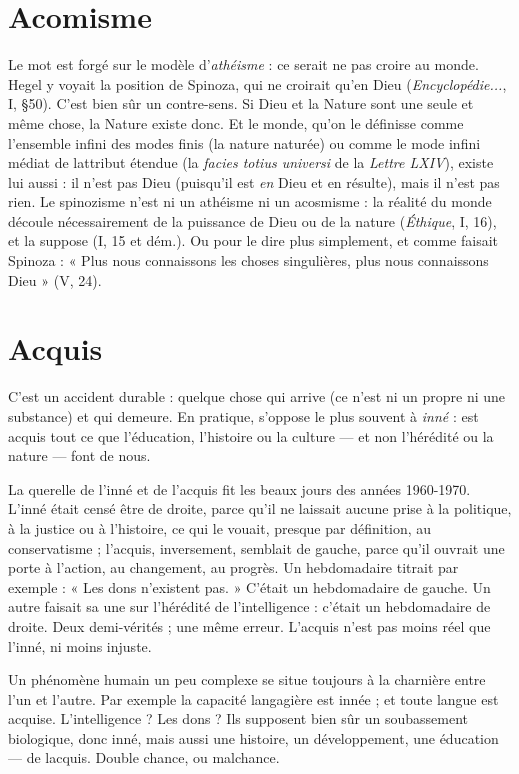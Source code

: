 \section{Acomisme}
Le mot est forgé sur le modèle d’{\it athéisme} : ce serait ne pas
croire au monde. Hegel y voyait la position de Spinoza, qui
ne croirait qu’en Dieu ({\it Encyclopédie...}, I, \S 50). C’est bien sûr un contre-sens.
Si Dieu et la Nature sont une seule et même chose, la Nature existe
donc. Et le monde, qu’on le définisse comme l’ensemble infini des modes
finis (la nature naturée) ou comme le mode infini médiat de lattribut
étendue (la {\it facies totius universi} de la {\it Lettre LXIV}), existe lui aussi : il n’est
pas Dieu (puisqu'il est {\it en} Dieu et en résulte), mais il n’est pas rien. Le spinozisme
n’est ni un athéisme ni un acosmisme : la réalité du monde découle
nécessairement de la puissance de Dieu ou de la nature ({\it Éthique}, I, 16), et
la suppose (I, 15 et dém.). Ou pour le dire plus simplement, et comme faisait
Spinoza : « Plus nous connaissons les choses singulières, plus nous connaissons
Dieu » (V, 24).

\section{Acquis}
C’est un accident durable : quelque chose qui arrive (ce n'est ni un
propre ni une substance) et qui demeure. En pratique, s’oppose le
plus souvent à {\it inné} : est acquis tout ce que l’éducation, l’histoire ou la culture
— et non l’hérédité ou la nature — font de nous.

La querelle de l’inné et de l’acquis fit les beaux jours des années 1960-1970.
L’inné était censé être de droite, parce qu’il ne laissait aucune prise à la politique,
à la justice ou à l’histoire, ce qui le vouait, presque par définition, au
conservatisme ; l’acquis, inversement, semblait de gauche, parce qu’il ouvrait
une porte à l’action, au changement, au progrès. Un hebdomadaire titrait par
exemple : « Les dons n’existent pas. » C'était un hebdomadaire de gauche. Un
autre faisait sa une sur l’hérédité de l'intelligence : c'était un hebdomadaire de
droite. Deux demi-vérités ; une même erreur. L’acquis n’est pas moins réel que
l’inné, ni moins injuste.

Un phénomène humain un peu complexe se situe toujours à la charnière
entre l’un et l’autre. Par exemple la capacité langagière est innée ; et toute
langue est acquise. L'intelligence ? Les dons ? Ils supposent bien sûr un soubassement
biologique, donc inné, mais aussi une histoire, un développement, une
éducation — de lacquis. Double chance, ou malchance.

